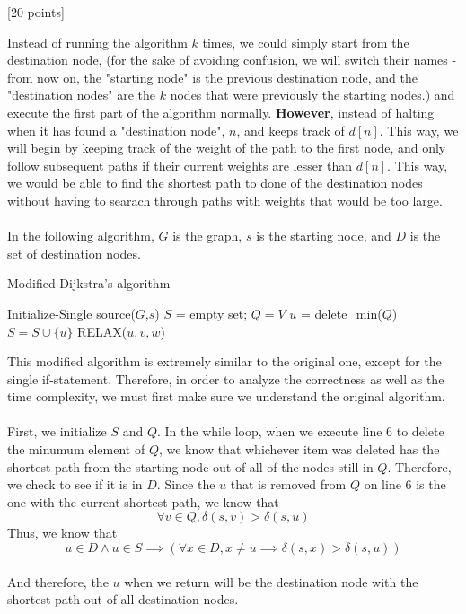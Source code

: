 \documentclass[12pt]{article}
\newcounter{ques}
\newenvironment{question}{\stepcounter{ques}{\noindent\bf Question \arabic{ques}:}}{\vspace{5mm}}
\begin{document}
\begin{question}[20 points]
\begin{itemize}
  Instead of running the algorithm $k$ times, we could simply start from the destination node, (for the sake of avoiding confusion, we will switch their names - from now on, the "starting node" is the previous destination node, and the "destination nodes" are the $k$ nodes that were previously the starting nodes.) and execute the first part of the algorithm normally. \textbf{However}, instead of halting when it has found a "destination node", $n$, and keeps track of $d[n]$. This way, we will begin by keeping track of the weight of the path to the first node, and only follow subsequent paths if their current weights are lesser than $d[n]$. This way, we would be able to find the shortest path to done of the destination nodes without having to searach through paths with weights that would be too large.\\\\
  In the following algorithm, $G$ is the graph, $s$ is the starting node, and $D$ is the set of destination nodes.
  \begin{algorithm}
  \caption{Modified Dijkstra's algorithm}\label{euclid}
  \begin{algorithmic}[1]
    \State Initialize-Single source($G$,$s$)
    \State $S$ = empty set;
    \State $Q=V$
      \State $u$ = delete\_min($Q$)
      \State $S= S\cup\{u\}$
        \State \Return
      \EndIf
        \State RELAX($u,v,w$)
      \EndFor
    \EndWhile
  \EndFunction
  \end{algorithmic}
  \end{algorithm}
 \end{itemize}
\end{question}

\newpage
This modified algorithm is extremely similar to the original one, except for the single if-statement. Therefore, in order to analyze the correctness as well as the time complexity, we must first make sure we understand the original algorithm.\\\\
First, we initialize $S$ and $Q$. In the while loop, when we execute line 6 to delete the minumum element of $Q$, we know that whichever item was deleted has the shortest path from the starting node out of all of the nodes still in $Q$. Therefore, we check to see if it is in $D$. Since the $u$ that is removed from $Q$ on line 6 is the one with the current shortest path, we know that
$$\forall v\in Q, \delta(s,v)>\delta(s,u)$$
Thus, we know that
$$u\in D \wedge u\in S \implies (\forall x\in D, x\neq u \implies \delta(s,x)>\delta(s,u))$$\\
And therefore, the $u$ when we return will be the destination node with the shortest path out of all destination nodes.\\\\
\end{document}
